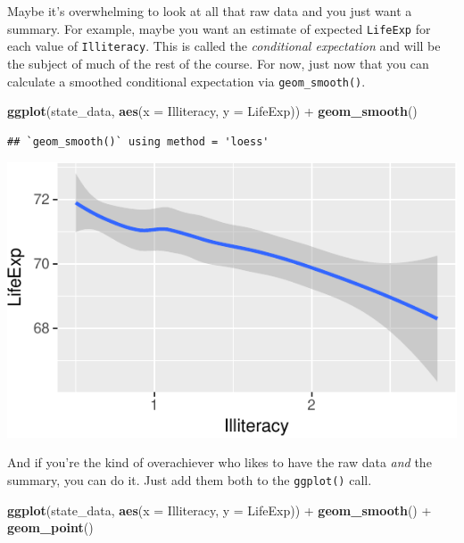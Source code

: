 \documentclass[12pt,oneside,openany]{book}
\newenvironment{Shaded}{\begin{snugshade}}{\end{snugshade}}
\newcommand{\KeywordTok}[1]{\textcolor[rgb]{0.13,0.29,0.53}{\textbf{{#1}}}}
\newcommand{\DataTypeTok}[1]{\textcolor[rgb]{0.13,0.29,0.53}{{#1}}}
\newcommand{\StringTok}[1]{\textcolor[rgb]{0.31,0.60,0.02}{{#1}}}
\newcommand{\NormalTok}[1]{{#1}}
\begin{document}
Maybe it's overwhelming to look at all that raw data and you just want a
summary. For example, maybe you want an estimate of expected
\texttt{LifeExp} for each value of \texttt{Illiteracy}. This is called
the \emph{conditional expectation} and will be the subject of much of
the rest of the course. For now, just now that you can calculate a
smoothed conditional expectation via \texttt{geom\_smooth()}.

\begin{Shaded}
\begin{Highlighting}[]
\KeywordTok{ggplot}\NormalTok{(state_data, }\KeywordTok{aes}\NormalTok{(}\DataTypeTok{x =} \NormalTok{Illiteracy, }\DataTypeTok{y =} \NormalTok{LifeExp)) +}
\StringTok{  }\KeywordTok{geom_smooth}\NormalTok{()}
\end{Highlighting}
\end{Shaded}

\begin{verbatim}
## `geom_smooth()` using method = 'loess'
\end{verbatim}

\includegraphics{pdaps_files/figure-latex/smooth-1.pdf}

And if you're the kind of overachiever who likes to have the raw data
\emph{and} the summary, you can do it. Just add them both to the
\texttt{ggplot()} call.

\begin{Shaded}
\begin{Highlighting}[]
\KeywordTok{ggplot}\NormalTok{(state_data, }\KeywordTok{aes}\NormalTok{(}\DataTypeTok{x =} \NormalTok{Illiteracy, }\DataTypeTok{y =} \NormalTok{LifeExp)) +}
\StringTok{  }\KeywordTok{geom_smooth}\NormalTok{() +}
\StringTok{  }\KeywordTok{geom_point}\NormalTok{()}
\end{Highlighting}
\end{Shaded}
\end{document}
